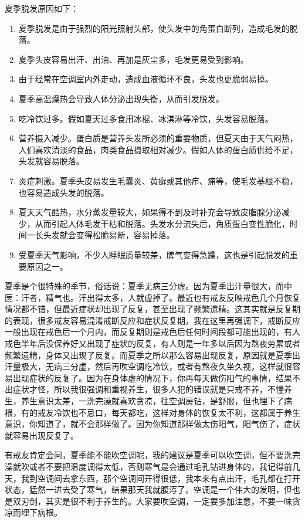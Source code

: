 \documentclass[fontset=founder]{ctexart}
\begin{document}
夏季脱发原因如下：

\begin{enumerate}
    \item 夏季脱发是由于强烈的阳光照射头部，使头发中的角蛋白断列，造成毛发的脱落。
    \item 夏季头皮容易出汗、出油、再加是灰尘多，毛发更易受到影响。
    \item 由于经常在空调室内外走动，造成血液循环不良，头发也更脆弱易掉。
    \item 夏季高温燥热会导致人体分泌出现失衡，从而引发脱发。
    \item 吃冷饮过多。假如夏天过多食用冰棍、冰淇淋等冷饮，头发容易脱落。
    \item 营养摄入减少。蛋白质是营养头发所必须的重要物质，但夏天由于天气闷热，人们喜欢清淡的食品，肉类食品摄取相对减少。假如人体的蛋白质供给不足，头发就容易脱落。
    \item 炎症刺激。夏季头皮易发生毛囊炎、黄癣或其他疖、痈等，使毛发基根不稳，也容易造成头发的脱落。
    \item 夏天天气酷热，水分蒸发量较大，如果得不到及时补充会导致皮脂腺分泌减少，从而引起人体毛发干枯和脱落。头发水分流失后，角质蛋白变性脆化，时间一长头发就会变得松脆易断，容易掉落。
    \item 受夏季天气影响，不少人睡眠质量较差，脾气变得急躁，这也是引起脱发的重要原因之一。
\end{enumerate}

夏季是个很特殊的季节，俗话说：夏季无病三分虚。因为夏季出汗量很大，而中医：汗者，精气也。汗出得太多，人就虚掉了。最近也有戒友反映戒色几个月恢复情况都不错，但最近症状却出现了反复，甚至出现了频繁遗精。这其实就是反复期的表现，很多戒友容易混淆戒断反应和症状反复期，我在这里再强调下，戒断反应一般出现在戒色后一个月内，而反复期则是戒色后任何时间段都可能出现的，有人戒色半年后没保养好又出现了症状的反复，有人则是一年多以后因为熬夜劳累或者频繁遗精，身体又出现了反复。而夏季之所以那么容易出现反复，原因就是夏季出汗量极大，无病三分虚，然后再吹空调吃冷饮，或者有熬夜久坐久视，这样就很容易出现症状的反复了。因为在身体虚的情况下，你再每天做伤阳气的事情，结果不出症状才怪，所以我很强调和重视养生，很多人犯的错误就是只戒不养，不懂养生，养生意识太差，一洗完澡就喜欢贪凉，往空调房钻，是舒服，但也埋下了病根，有的戒友冷饮也不忌口，每天都吃，这样对身体的恢复太不利，这都属于养生意识，你知道了，就不会那样做了。因为你知道那样做太伤阳气，阳气伤了，症状就容易出现反复了。

有戒友肯定会问，夏季能不能吹空调呢，我的建议是夏季可以吹空调，但不要洗完澡就吹或者不要把温度调得太低，否则寒气是会通过毛孔钻进身体的，我记得前几天，我到空调间去拿东西，那个空调间开得很低，我本来有点出汗，毛孔都在打开状态，猛然一进去受了寒气，结果那天我就腹泻了。空调是一个伟大的发明，但也是双刃剑，其实是很不利于养生的。大家要吹空调，一定要多加注意，不要一味贪凉而埋下病根。
\end{document}
